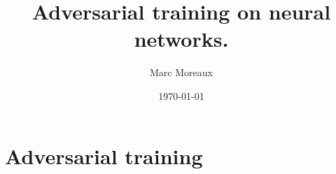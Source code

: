\documentclass[a4paper]{article}
\title{Adversarial training on neural networks.}
\author{Marc Moreaux}
\date{\today}
\begin{document}
\maketitle





\section{Adversarial training}







\end{document}
